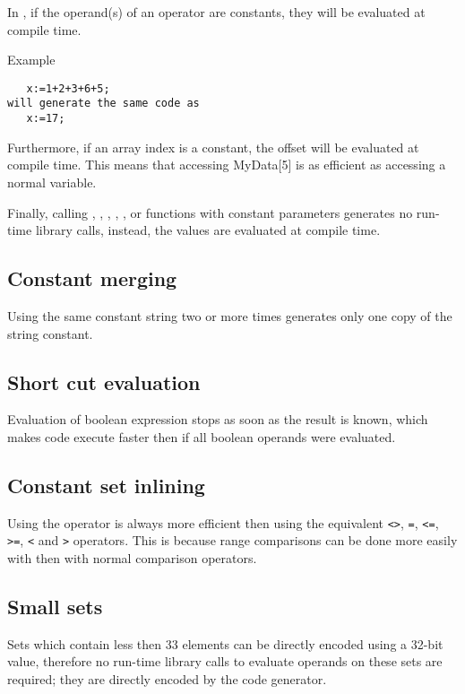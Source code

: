 In \fpc, if the operand(s) of an operator are constants, they
will be evaluated at compile time.

Example

\begin{verbatim}
   x:=1+2+3+6+5;
will generate the same code as
   x:=17;
\end{verbatim}

Furthermore, if an array index is a constant, the offset will
be evaluated at compile time. This means that accessing MyData[5]
is as efficient as accessing a normal variable.

Finally, calling , , , , ,
or  functions with constant parameters generates no
run-time library calls, instead, the values are evaluated at
compile time.

\subsection{Constant merging}

Using the same constant string two or more times generates only
one copy of the string constant.

\subsection{Short cut evaluation}

Evaluation of boolean expression stops as soon as the result is
known, which makes code execute faster then if all boolean operands
were evaluated.

\subsection{Constant set inlining}

Using the  operator is always more efficient then using the
equivalent \verb|<>|, \verb|=|, \verb|<=|, \verb|>=|, \verb|<| and \verb|>|
operators. This is because range comparisons can be done more easily with
 then with normal comparison operators.

\subsection{Small sets}

Sets which contain less then 33 elements can be directly encoded
using a 32-bit value, therefore no run-time library calls to
evaluate operands on these sets are required; they are directly encoded
by the code generator.

